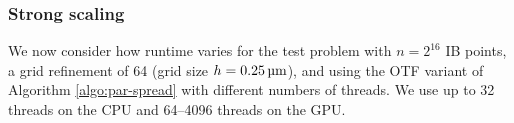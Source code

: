 \subsubsection{Strong scaling}
We now consider how runtime varies for the test problem with $n=2^{16}$ IB
points, a grid refinement of 64 (grid size $h=0.25\um$), and using the OTF
variant of Algorithm \ref{algo:par-spread} with different numbers of threads.
We use up to 32 threads on the CPU and 64--4096 threads on the GPU.



